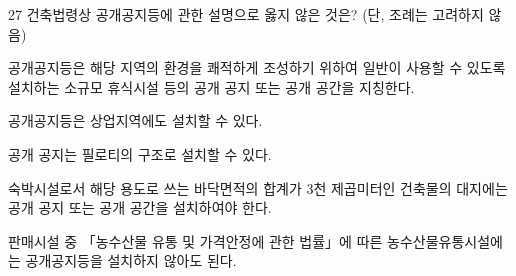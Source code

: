 \begin{question}{27}
건축법령상 공개공지등에 관한 설명으로 옳지 않은 것은? (단, 조례는 고려하지 않음)
\begin{choices}
  \item 공개공지등은 해당 지역의 환경을 쾌적하게 조성하기 위하여 일반이 사용할 수 있도록 설치하는 소규모 휴식시설 등의 공개 공지 또는 공개 공간을 지칭한다.
  \item 공개공지등은 상업지역에도 설치할 수 있다.
  \item 공개 공지는 필로티의 구조로 설치할 수 있다.
  \item 숙박시설로서 해당 용도로 쓰는 바닥면적의 합계가 3천 제곱미터인 건축물의 대지에는 공개 공지 또는 공개 공간을 설치하여야 한다.
  \item 판매시설 중 「농수산물 유통 및 가격안정에 관한 법률」에 따른 농수산물유통시설에는 공개공지등을 설치하지 않아도 된다.
\end{choices}
\end{question}
